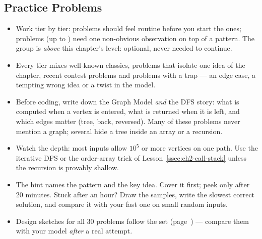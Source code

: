 \subsection{Practice Problems}
\label{ssec:ch2-problem-set}

\begin{insightbox}
\begin{itemize}[leftmargin=*]
    \item Work tier by tier: \exeasy{} problems should feel routine before you start the \exmedium{} ones; \exhard{} problems (up to ) need one non-obvious observation on top of a pattern. The \exstretch{} group is \emph{above} this chapter's level: optional, never needed to continue.
    \item Every tier mixes well-known classics, problems that isolate one idea of the chapter, recent contest problems and problems with a trap --- an edge case, a tempting wrong idea or a twist in the model.
    \item Before coding, write down the Graph Model \emph{and} the DFS story: what is computed when a vertex is entered, what is returned when it is left, and which edges matter (tree, back, reversed). Many of these problems never mention a graph; several hide a tree inside an array or a recursion.
    \item Watch the depth: most inputs allow $10^5$ or more vertices on one path. Use the iterative DFS or the order-array trick of Lesson~\ref{ssec:ch2-call-stack} unless the recursion is provably shallow.
    \item The hint names the pattern and the key idea. Cover it first; peek only after 20 minutes. Stuck after an hour? Draw the samples, write the slowest correct solution, and compare it with your fast one on small random inputs.
    \item Design sketches for all 30 problems follow the set (page~\pageref{ssec:ch2-sketches}) --- compare them with your model \emph{after} a real attempt.
\end{itemize}
\end{insightbox}

